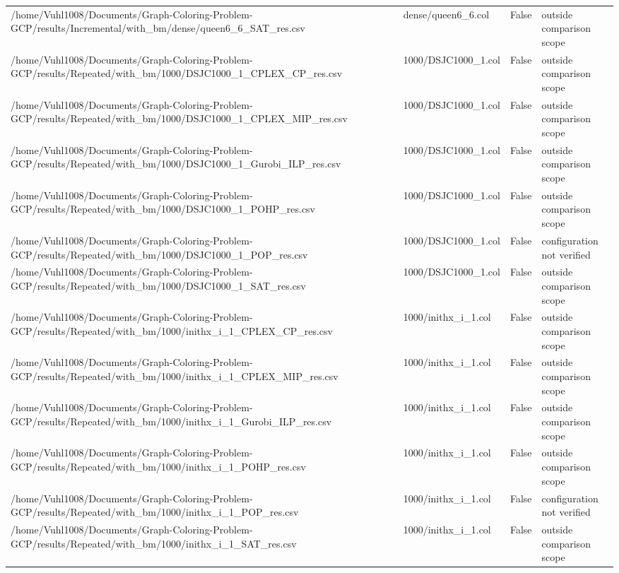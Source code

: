 \begin{table}[htbp]
\begin{tabular}{llll}
/home/Vuhl1008/Documents/Graph-Coloring-Problem-GCP/results/Incremental/with\_bm/dense/queen6\_6\_SAT\_res.csv & dense/queen6\_6.col & False & outside comparison scope \\
/home/Vuhl1008/Documents/Graph-Coloring-Problem-GCP/results/Repeated/with\_bm/1000/DSJC1000\_1\_CPLEX\_CP\_res.csv & 1000/DSJC1000\_1.col & False & outside comparison scope \\
/home/Vuhl1008/Documents/Graph-Coloring-Problem-GCP/results/Repeated/with\_bm/1000/DSJC1000\_1\_CPLEX\_MIP\_res.csv & 1000/DSJC1000\_1.col & False & outside comparison scope \\
/home/Vuhl1008/Documents/Graph-Coloring-Problem-GCP/results/Repeated/with\_bm/1000/DSJC1000\_1\_Gurobi\_ILP\_res.csv & 1000/DSJC1000\_1.col & False & outside comparison scope \\
/home/Vuhl1008/Documents/Graph-Coloring-Problem-GCP/results/Repeated/with\_bm/1000/DSJC1000\_1\_POHP\_res.csv & 1000/DSJC1000\_1.col & False & outside comparison scope \\
/home/Vuhl1008/Documents/Graph-Coloring-Problem-GCP/results/Repeated/with\_bm/1000/DSJC1000\_1\_POP\_res.csv & 1000/DSJC1000\_1.col & False & configuration not verified \\
/home/Vuhl1008/Documents/Graph-Coloring-Problem-GCP/results/Repeated/with\_bm/1000/DSJC1000\_1\_SAT\_res.csv & 1000/DSJC1000\_1.col & False & outside comparison scope \\
/home/Vuhl1008/Documents/Graph-Coloring-Problem-GCP/results/Repeated/with\_bm/1000/inithx\_i\_1\_CPLEX\_CP\_res.csv & 1000/inithx\_i\_1.col & False & outside comparison scope \\
/home/Vuhl1008/Documents/Graph-Coloring-Problem-GCP/results/Repeated/with\_bm/1000/inithx\_i\_1\_CPLEX\_MIP\_res.csv & 1000/inithx\_i\_1.col & False & outside comparison scope \\
/home/Vuhl1008/Documents/Graph-Coloring-Problem-GCP/results/Repeated/with\_bm/1000/inithx\_i\_1\_Gurobi\_ILP\_res.csv & 1000/inithx\_i\_1.col & False & outside comparison scope \\
/home/Vuhl1008/Documents/Graph-Coloring-Problem-GCP/results/Repeated/with\_bm/1000/inithx\_i\_1\_POHP\_res.csv & 1000/inithx\_i\_1.col & False & outside comparison scope \\
/home/Vuhl1008/Documents/Graph-Coloring-Problem-GCP/results/Repeated/with\_bm/1000/inithx\_i\_1\_POP\_res.csv & 1000/inithx\_i\_1.col & False & configuration not verified \\
/home/Vuhl1008/Documents/Graph-Coloring-Problem-GCP/results/Repeated/with\_bm/1000/inithx\_i\_1\_SAT\_res.csv & 1000/inithx\_i\_1.col & False & outside comparison scope \\

\end{tabular}
\end{table}
